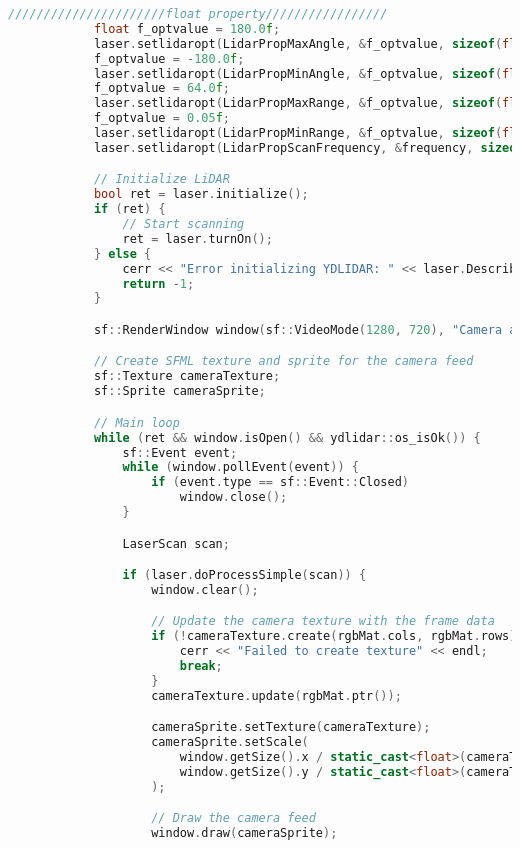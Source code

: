\begin{lstlisting}[language={C++}, caption={C\'odigo de ejemplo de Kinect y LiDAR}, label={Script}]
            //////////////////////float property/////////////////
            float f_optvalue = 180.0f;
            laser.setlidaropt(LidarPropMaxAngle, &f_optvalue, sizeof(float));
            f_optvalue = -180.0f;
            laser.setlidaropt(LidarPropMinAngle, &f_optvalue, sizeof(float));
            f_optvalue = 64.0f;
            laser.setlidaropt(LidarPropMaxRange, &f_optvalue, sizeof(float));
            f_optvalue = 0.05f;
            laser.setlidaropt(LidarPropMinRange, &f_optvalue, sizeof(float));
            laser.setlidaropt(LidarPropScanFrequency, &frequency, sizeof(float));

            // Initialize LiDAR
            bool ret = laser.initialize();
            if (ret) {
                // Start scanning
                ret = laser.turnOn();
            } else {
                cerr << "Error initializing YDLIDAR: " << laser.DescribeError() << endl;
                return -1;
            }

            sf::RenderWindow window(sf::VideoMode(1280, 720), "Camera and LiDAR Visualization");

            // Create SFML texture and sprite for the camera feed
            sf::Texture cameraTexture;
            sf::Sprite cameraSprite;

            // Main loop
            while (ret && window.isOpen() && ydlidar::os_isOk()) {
                sf::Event event;
                while (window.pollEvent(event)) {
                    if (event.type == sf::Event::Closed)
                        window.close();
                }

                LaserScan scan;

                if (laser.doProcessSimple(scan)) {
                    window.clear();

                    // Update the camera texture with the frame data
                    if (!cameraTexture.create(rgbMat.cols, rgbMat.rows)) {
                        cerr << "Failed to create texture" << endl;
                        break;
                    }
                    cameraTexture.update(rgbMat.ptr());

                    cameraSprite.setTexture(cameraTexture);
                    cameraSprite.setScale(
                        window.getSize().x / static_cast<float>(cameraTexture.getSize().x),
                        window.getSize().y / static_cast<float>(cameraTexture.getSize().y)
                    );

                    // Draw the camera feed
                    window.draw(cameraSprite);


\end{lstlisting}
